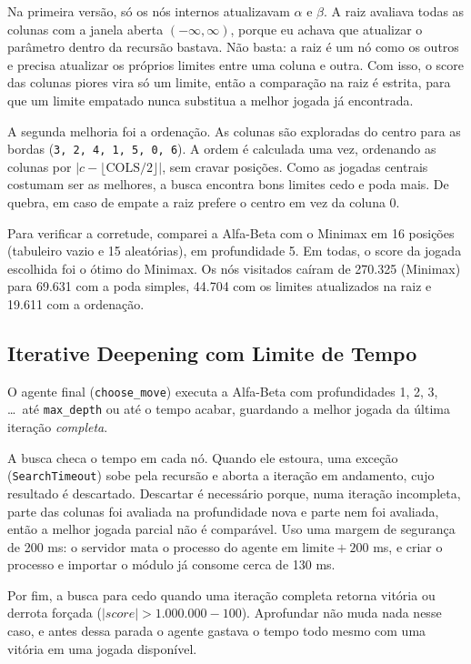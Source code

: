 \documentclass[letterpaper]{article} %
\begin{document}
Na primeira versão, só os nós internos atualizavam $\alpha$ e $\beta$. A raiz avaliava todas as colunas com a janela aberta $(-\infty, \infty)$, porque eu achava que atualizar o parâmetro dentro da recursão bastava. Não basta: a raiz é um nó como os outros e precisa atualizar os próprios limites entre uma coluna e outra. Com isso, o score das colunas piores vira só um limite, então a comparação na raiz é estrita, para que um limite empatado nunca substitua a melhor jogada já encontrada.

A segunda melhoria foi a ordenação. As colunas são exploradas do centro para as bordas (\texttt{3, 2, 4, 1, 5, 0, 6}). A ordem é calculada uma vez, ordenando as colunas por $|c - \lfloor \mathrm{COLS}/2 \rfloor|$, sem cravar posições. Como as jogadas centrais costumam ser as melhores, a busca encontra bons limites cedo e poda mais. De quebra, em caso de empate a raiz prefere o centro em vez da coluna 0.

Para verificar a corretude, comparei a Alfa-Beta com o Minimax em 16 posições (tabuleiro vazio e 15 aleatórias), em profundidade 5. Em todas, o score da jogada escolhida foi o ótimo do Minimax. Os nós visitados caíram de 270.325 (Minimax) para 69.631 com a poda simples, 44.704 com os limites atualizados na raiz e 19.611 com a ordenação.

\subsection{Iterative Deepening com Limite de Tempo}
O agente final (\texttt{choose\_move}) executa a Alfa-Beta com profundidades 1, 2, 3, \ldots\ até \texttt{max\_depth} ou até o tempo acabar, guardando a melhor jogada da última iteração \emph{completa}.

A busca checa o tempo em cada nó. Quando ele estoura, uma exceção (\texttt{SearchTimeout}) sobe pela recursão e aborta a iteração em andamento, cujo resultado é descartado. Descartar é necessário porque, numa iteração incompleta, parte das colunas foi avaliada na profundidade nova e parte nem foi avaliada, então a melhor jogada parcial não é comparável. Uso uma margem de segurança de 200 ms: o servidor mata o processo do agente em $\mathrm{limite} + 200$ ms, e criar o processo e importar o módulo já consome cerca de 130 ms.

Por fim, a busca para cedo quando uma iteração completa retorna vitória ou derrota forçada ($|score| > 1.000.000 - 100$). Aprofundar não muda nada nesse caso, e antes dessa parada o agente gastava o tempo todo mesmo com uma vitória em uma jogada disponível.
\end{document}
